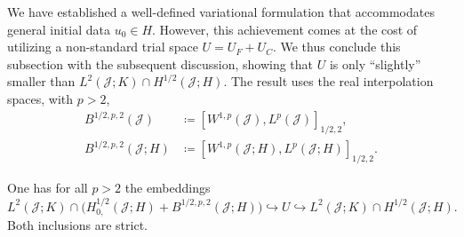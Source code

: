 \documentclass{amsart}
\newcommand{\cJ}{\mathcal J}
\begin{document}
We have established a well-defined variational formulation that accommodates general initial data $u_0 \in H$. However, this achievement comes at the cost of utilizing a non-standard trial space $U = U_F + U_C$. 
We thus conclude this subsection with the subsequent discussion, showing that $U$ is only ``slightly'' smaller than $L^2(\cJ;K) \cap H^{1/2}(\cJ;H)$.
The result uses the real interpolation spaces, with $p>2$, 
\begin{equation*}
\begin{aligned}
B^{1/2,p,2}(\cJ) &\coloneqq [W^{1,p}(\cJ),L^p(\cJ)]_{1/2,2},\\
B^{1/2,p,2}(\cJ;H) &\coloneqq [W^{1,p}(\cJ;H),L^p(\cJ;H)]_{1/2,2}.
\end{aligned}
\end{equation*}
%
\begin{proposition}[Embedding of $U$] \label{prop:2}
One has for all $p>2$ the embeddings
\begin{equation*}
L^2(\cJ;K) \cap \big(H_{0,}^{1/2}(\cJ;H)+ B^{1/2,p,2}(\cJ;H)\big) \hookrightarrow U \hookrightarrow L^2(\cJ;K) \cap H^{1/2}(\cJ;H).
\end{equation*}
Both inclusions are strict. 
\end{proposition}
\end{document}
